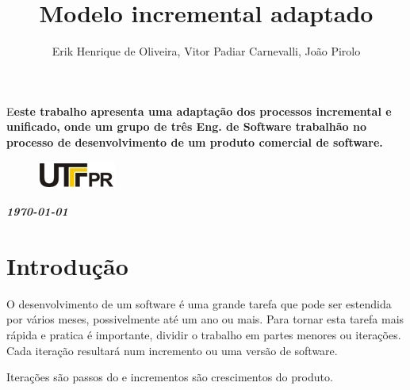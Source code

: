 \documentclass[	DIV=calc,%
							paper=a4,%
							fontsize=12pt,%
							onecolumn]{scrartcl}	 					%
\title{Modelo incremental adaptado }					%
\author{Erik Henrique de Oliveira, Vitor Padiar Carnevalli, João Pirolo }  	%
\date{}																				%
\newcommand{\initial}[1]{%
     \lettrine[lines=3,lhang=0.3,nindent=0em]{
     				\color{DarkGoldenrod}
     				{\textsf{#1}}}{}}
\begin{document}
\maketitle
\thispagestyle{fancy} 	
\thispagestyle{empty}		%




\initial{E}\textbf{este trabalho apresenta uma adaptação dos processos incremental e unificado, onde um grupo de três Eng. de Software trabalhão no processo de desenvolvimento de um produto comercial de software. } 

\begin{figure}
	\centering
	\includegraphics{utfpr}
\end{figure}

\vspace{3cm}
\centerline{\textit{\textbf{\today}}}

\clearpage
    \renewcommand*\listfigurename{Lista de figuras}
\listoffigures

\renewcommand*\listtablename{Lista de tabelas}
\listoftables




\clearpage
\renewcommand{\contentsname}{Sumário}
\tableofcontents
\clearpage

\section{Introdução}

O desenvolvimento de um software é uma grande tarefa que pode ser estendida por vários meses, possivelmente até um ano ou mais. Para tornar esta tarefa mais rápida e pratica é importante, dividir o trabalho em partes menores ou iterações. Cada iteração resultará num incremento ou uma versão de software. 

 Iterações são passos do e incrementos são crescimentos do produto.
\end{document}
